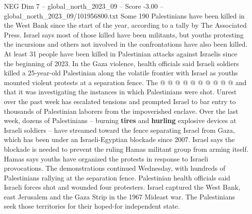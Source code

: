 \begin{textsample}{NEG Dim 7 – global\_north\_2023\_09 – Score -3.00 – global\_north\_2023\_09/101956800.txt}
Some 190 Palestinians have been killed in the West Bank since the start of the year, according to a tally by The Associated Press.
Israel says most of those killed have been militants, but youths protesting the incursions and others not involved in the confrontations have also been killed.
At least 31 people have been killed in Palestinian attacks against Israelis since the beginning of 2023.
In the Gaza violence, health officials said Israeli soldiers killed a 25-year-old Palestinian along the volatile frontier with Israel as youths mounted violent protests at a separation fence.
The @ @ @ @ @ @ @ @ @ @ and that it was investigating the instances in which Palestinians were shot.
Unrest over the past week has escalated tensions and prompted Israel to bar entry to thousands of Palestinian laborers from the impoverished enclave.
Over the last week, dozens of Palestinians -- burning \textbf{tires} and \textbf{hurling} explosive devices at Israeli soldiers -- have streamed toward the fence separating Israel from Gaza, which has been under an Israeli-Egyptian blockade since 2007.
Israel says the blockade is needed to prevent the ruling Hamas militant group from arming itself.
Hamas says youths have organized the protests in response to Israeli provocations.
The demonstrations continued Wednesday, with hundreds of Palestinians rallying at the separation fence.
Palestinian health officials said Israeli forces shot and wounded four protesters.
Israel captured the West Bank, east Jerusalem and the Gaza Strip in the 1967 Mideast war.
The Palestinians seek those territories for their hoped-for independent state.

\end{textsample}
